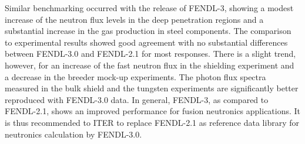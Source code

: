 Similar benchmarking occurred with the release of \gls{FENDL}-3, showing a
modest increase of the neutron flux levels in the deep penetration regions and
a substantial increase in the gas production in steel components.  The
comparison to experimental results showed good agreement with no substantial
differences between FENDL-3.0 and FENDL-2.1 for most responses.  There is a
slight trend, however, for an increase of the fast neutron flux in the
shielding experiment and a decrease in the breeder mock-up experiments. The
photon flux spectra measured in the bulk shield and the tungsten experiments
are significantly better reproduced with FENDL-3.0 data. In general, FENDL-3,
as compared to FENDL-2.1, shows an improved performance for fusion neutronics
applications. It is thus recommended to ITER to replace FENDL-2.1 as reference
data library for neutronics calculation by
FENDL-3.0.


